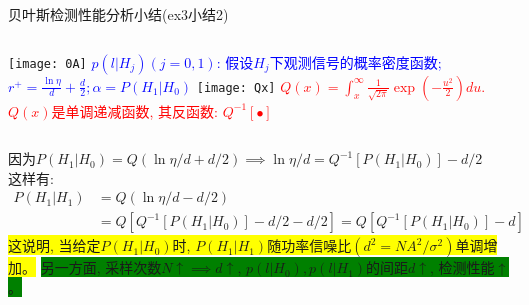 \begin{frame}{贝叶斯检测性能分析小结(ex3小结2)}
\begin{columns}
	\texttt{[image: 0A]}
	\scriptsize
	\textcolor{blue}{$p(l|H_j)(j=0,1)$: 假设$H_j$下观测信号的概率密度函数; $r^+=\frac{\ln\eta}{d}+\frac{d}{2}; \alpha=P(H_1|H_0)$}
	\texttt{[image: Qx]}
	\scriptsize
	\textcolor{red}{$Q(x)=\int_{x}^{\infty}\frac{1}{\sqrt{2\pi}}\exp(-\frac{u^2}{2})du$.}\\
	\textcolor{red}{$Q(x)$是单调递减函数, 其反函数: $Q^{-1}[\bullet]$}
\end{columns}

\bigskip

 因为$P(H_1|H_0)=Q(\ln\eta/d+d/2) \implies \ln\eta/d=Q^{-1}[P(H_1|H_0)]-d/2$\\
这样有:
\begin{align*}
P(H_1|H_1)&=Q\left(\ln\eta/d-d/2\right)\\
&=Q[Q^{-1}[P(H_1|H_0)]-d/2-d/2]=Q[Q^{-1}[P(H_1|H_0)]-d]
\end{align*}
\colorbox{yellow}{这说明, 当给定$P(H_1|H_0)$时, $P(H_1|H_1)$随功率信噪比$(d^2=NA^2/\sigma^2)$单调增加。} 
\colorbox{green}{另一方面, 采样次数$N\uparrow\implies d\uparrow$, $p(l|H_0),p(l|H_1)$的间距$d\uparrow$,  检测性能$\uparrow$。} 
\end{frame}

